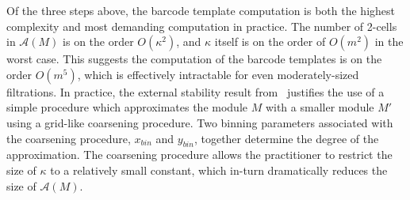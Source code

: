 \documentclass{siamart190516}
\begin{document}
Of the three steps above, the barcode template computation is both the highest complexity and most demanding computation in practice. The number of 2-cells in $\mathcal{A}(M)$ is on the order $O(\kappa^2)$, and $\kappa$ itself is on the order of $O(m^2)$ in the worst case. 
This suggests the computation of the barcode templates is on the order $O(m^5)$, which is effectively intractable for even moderately-sized filtrations. In practice, the external stability result from~\cite{landi2014rank} justifies the use of a simple procedure which approximates the module $M$ with a smaller module $M'$ using a grid-like coarsening procedure. Two binning parameters associated with the coarsening procedure, $x_{bin}$ and $y_{bin}$, together determine the degree of the approximation. The coarsening procedure allows the practitioner to restrict the size of $\kappa$ to a relatively small constant, which in-turn dramatically reduces the size of $\mathcal{A}(M)$. 
\end{document}
